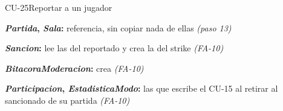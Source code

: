 \begin{fichacu}{CU-25}{Reportar a un jugador}
{\begin{cudatos}
      \item \textbf{\textit{Partida}, \textit{Sala}:} referencia, sin copiar nada de ellas \textit{(paso 13)}
      \item \textbf{\textit{Sancion}:} lee las del reportado y crea la del strike \textit{(\mbox{FA-10})}
      \item \textbf{\textit{BitacoraModeracion}:} crea \textit{(\mbox{FA-10})}
      \item \textbf{\textit{Participacion}, \textit{EstadisticaModo}:} las que escribe el \mbox{CU-15} al retirar al sancionado de su partida \textit{(\mbox{FA-10})}
    \end{cudatos}} \\ \hline
\end{fichacu}
\clearpage
